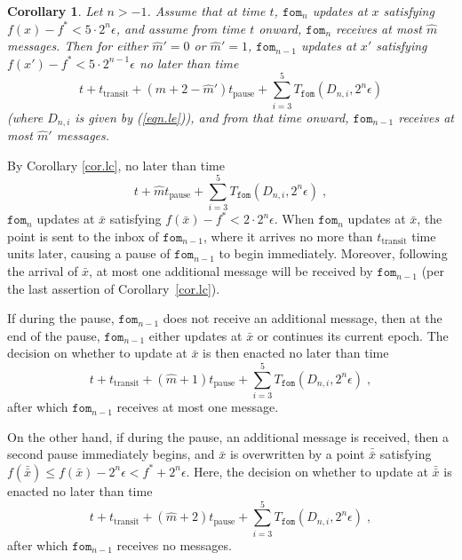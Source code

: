 \documentclass[reqno, 11pt]{amsart}
\newtheorem{cor}[prop]{Corollary}
\numberwithin{equation}{section}
\newcommand{\fom}{\mathtt{fom}}
\newcommand{\tpause}{t_{\mathrm{pause}}}
\newcommand{\ttransit}{t_{\mathrm{transit}}}
\begin{document}
\begin{cor}  \label{cor.ld} 
Let $  n > -1 $. Assume that at time $ t $, $ \fom_{n} $ updates at $ x $ satisfying $ f(x) -  f^* < 5 \cdot 2^n \epsilon $, and assume from time $ t $ onward, $ \fom_n $ receives at most $ \hat{m}   $ messages. Then for either $ \hat{m}'  = 0 $ or $ \hat{m}'  = 1 $, $ \fom_{n-1} $ updates at $ x' $ satisfying $ f( x') - f^* < 5 \cdot 2^{n-1} \epsilon $ no later than time
\[ 
     t + \ttransit + ( \hat{m}  + 2 - \hat{m}' ) \tpause  + \sum_{i=3}^5 T_{\fom}( D_{n,i}, 2^n \epsilon )  
\] 
(where $ D_{n,i} $ is given by (\ref{eqn.le})), and from that time onward, $ \fom_{n-1} $ receives at most $ \hat{m}'  $ messages.
\end{cor}
   By Corollary \ref{cor.lc}, no later than time 
\[ 
t + \hat{m} \tpause  + \sum_{i=3}^5 T_{\fom}( D_{n,i}, 2^n \epsilon ) \; , 
\] 
 $ \fom_n $ updates at $ \bar{x} $ satisfying $ f(\bar{x}) - f^* <  2 \cdot 2^n \epsilon $. When $ \fom_n $ updates at $ \bar{x} $, the point is sent to the inbox of $ \fom_{n-1} $, where it arrives no more than $ \ttransit $ time units later, causing a pause of $ \fom_{n-1} $ to begin immediately. Moreover, following the arrival of $ \bar{x} $, at most one additional message will be received by $ \fom_{n-1} $ (per the last assertion of Corollary~\ref{cor.lc}). 
 
If during the pause, $ \fom_{n-1} $ does not receive an additional message, then at the end of the pause, $ \fom_{n-1} $ either updates at $ \bar{x} $ or continues its current epoch.  The decision on whether to update at $ \bar{x} $ is then enacted no later than time
\begin{equation}  \label{eqn.lf} 
 t + \ttransit + (\hat{m}  + 1) \tpause + \sum_{i=3}^5 T_{\fom}( D_{n,i}, 2^n \epsilon ) \; ,
\end{equation} 
after which $ \fom_{n-1} $ receives at most one message.

On the other hand, if during the pause, an additional message is received, then a second pause immediately begins, and $ \bar{x} $ is overwritten by a point $ \bar{\bar{x}} $ satisfying $ f(\bar{\bar{x}}) \leq f( \bar{x}) - 2^n \epsilon  < f^* + 2^n \epsilon $. Here, the decision on whether to update at $ \bar{\bar{x}} $ is enacted no later than time
\begin{equation}  \label{eqn.lg} 
 t + \ttransit + ( \hat{m}  + 2) \tpause + \sum_{i=3}^5 T_{\fom}( D_{n,i}, 2^n \epsilon ) \; ,
\end{equation} 
after which $ \fom_{n-1} $ receives no messages.
\end{document}
